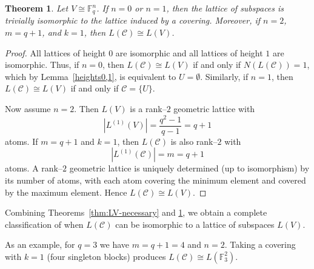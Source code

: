 \documentclass{article}
\newtheorem{theorem}{Theorem}[section]
\begin{document}
\begin{theorem}\label{thm:LV-sufficient}
Let \(V\cong \mathbb F_q^n\). If $n=0$ or $n=1$, then the lattice of subspaces is trivially isomorphic to the lattice induced by a covering. Moreover, if \(n=2\), \(m=q+1\), and \(k=1\), then \(L(\mathcal C)\cong L(V)\).
\end{theorem}

\begin{proof}
   All lattices of height  $0$ are isomorphic and all lattices of height  $1$  are isomorphic. Thus, if $n=0$, then $L(\mathcal{C})\cong L(V)$ if and only if $N(L(\mathcal{C}))=1$, which by Lemma~\ref{heights0,1}, is equivalent to $U = \emptyset$. Similarly, if $n=1$, then $L(\mathcal{C})\cong L(V)$ if and only if $\mathcal{C}=\{U\}$.

Now assume \(n=2\).
Then \(L(V)\) is a rank--\(2\) geometric lattice with
\[
|L^{(1)}(V)|=\frac{q^2-1}{q-1}=q+1
\]
atoms. If \(m=q+1\) and \(k=1\), then \(L(\mathcal C)\) is also rank--\(2\) with
\[
|L^{(1)}(\mathcal C)|=m=q+1
\]
atoms. A rank--\(2\) geometric lattice is uniquely determined (up to isomorphism) by its number of atoms, with each atom covering the minimum element and covered by the maximum element.
Hence \(L(\mathcal C)\cong L(V)\).
\end{proof}

Combining Theorems~\ref{thm:LV-necessary} and \ref{thm:LV-sufficient}, we obtain a complete classification of when $L(\mathcal{C})$ can be isomorphic to a lattice of subspaces $L(V)$.

As an example, for \(q=3\) we have \(m=q+1=4\) and \(n=2\).
Taking a covering with \(k=1\) (four singleton blocks) produces \(L(\mathcal C)\cong L(\mathbb F_3^2)\).
\end{document}

